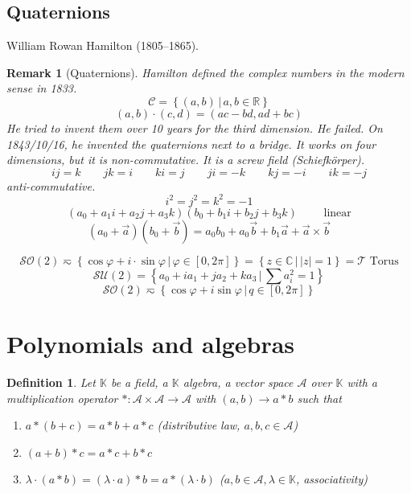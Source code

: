 \documentclass{article}
\newtheorem{definition}{Definition}  \numberwithin{definition}{section}
\newtheorem{remark}{Remark}  \numberwithin{remark}{section}
\newcommand{\setdef}[2]{\left\{\left.#1\,\right|\,#2\right\}}
\newcommand{\card}[1]{\left|#1\right|}
\begin{document}
\subsection{Quaternions}

William Rowan Hamilton (1805--1865).

\begin{remark}[Quaternions]
  Hamilton defined the complex numbers in the modern sense in 1833.
  \[ \mathcal C = \setdef{(a,b)}{a,b \in \mathbb R} \]
  \[ (a,b) \cdot (c, d) = (ac - bd, ad + bc) \]
  He tried to invent them over 10 years for the third dimension.
  He failed.
  On 1843/10/16, he invented the quaternions next to a bridge.
  It works on four dimensions, but it is non-commutative.
  It is a screw field (\foreignlanguage{german}{Schiefk\"orper}).
  \[ ij = k \qquad jk = i \qquad ki = j \qquad ji = -k \qquad kj = -i \qquad ik = -j \]
  anti-commutative.
  \[ i^2 = j^2 = k^2 = -1 \]
  \[ (a_0 + a_1 i + a_2 j + a_3 k) (b_0 + b_1 i + b_2 j + b_3 k) \qquad \text{ linear} \]
  \[ (a_0 + \vec a) (b_0 + \vec b) = a_0 b_0 + a_0 \vec b + b_1 \vec a + \vec a \times \vec b \]
\end{remark}

\[ \mathcal{SO}(2) \eqsim \setdef{\cos\varphi + i \cdot \sin\varphi}{\varphi \in [0,2\pi]} = \setdef{z \in \mathbb C}{\card{z} = 1} = \mathcal T \text{ Torus} \]
\[ \mathcal{SU}(2) = \setdef{a_0 + i a_1 + j a_2 + k a_3}{\sum a_i^2 = 1} \]
\[ \mathcal{SO}(2) \eqsim \setdef{\cos \varphi + i \sin\varphi}{q \in [0,2\pi]} \]

\section{Polynomials and algebras}

\begin{definition} %
  Let $\mathbb K$ be a field, a $\mathbb K$ algebra, a vector space $\mathcal A$ over $\mathbb K$
  with a multiplication operator $*: \mathcal A \times \mathcal A \to \mathcal A$ with $(a,b) \to a * b$ such that
  \begin{enumerate}
    \item $a * (b + c) = a * b + a * c$ (distributive law, $a, b, c \in \mathcal A$)
    \item $(a + b) * c = a * c + b * c$
    \item $\lambda \cdot (a * b) = (\lambda \cdot a) * b = a * (\lambda \cdot b)$ ($a, b \in \mathcal A, \lambda \in \mathbb K$, associativity)
  \end{enumerate}
\end{definition}
\end{document}
